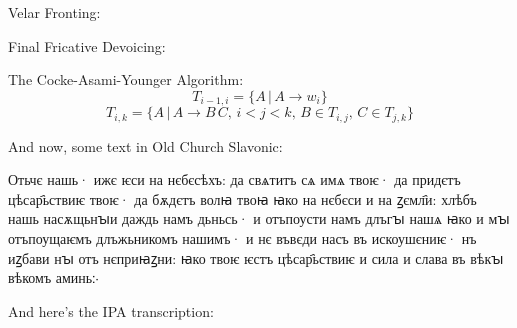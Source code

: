 \documentclass{article}
\begin{document}
\vspace{3mm}
Velar Fronting:
\vspace{3mm}
\newline
{}

\vspace{3mm}
Final Fricative Devoicing:
\vspace{3mm}
\newline
{}

\vspace{3mm}
The Cocke-Asami-Younger Algorithm:
\[T_{i-1,i} = \big\{ A \, | \, A \rightarrow w_{i}\big\}\]
\[T_{i,k} = \big\{ A \, | \, A \rightarrow B \, C, \, i < j < k, \, B \in T_{i,j}, \, C \in T_{j,k} \big\}\]

\vspace{3mm}
And now, some text in Old Church Slavonic:

\foreignlanguage{churchslavonic}
{Отьчє нашь·
ижє ѥси на нєбєсѣхъ:
да свѧтитъ сѧ имѧ твоѥ·
да придєтъ цѣсар҄ьствиѥ твоѥ·
да бѫдєтъ волꙗ твоꙗ
ꙗко на нєбєси и на ꙁємл҄и:
хлѣбъ нашь насѫщьнꙑи
даждь намъ дьньсь·
и отъпоусти намъ длъгꙑ нашѧ
ꙗко и мꙑ отъпоущаѥмъ
длъжьникомъ нашимъ·
и нє въвєди насъ въ искоушєниѥ·
нъ иꙁбави нꙑ отъ нєприꙗꙁни:
ꙗко твоѥ ѥстъ цѣсар҄ьствиѥ
и сила и слава въ вѣкꙑ вѣкомъ
аминь჻}

And here's the IPA transcription:

\end{document}
